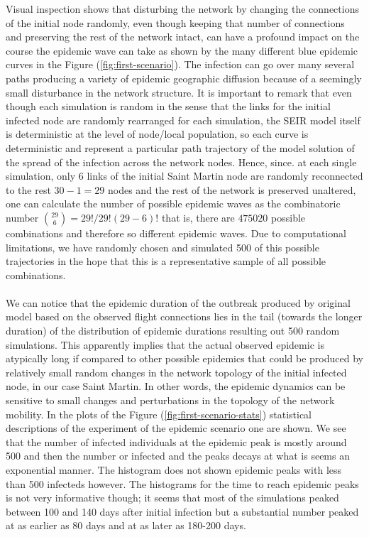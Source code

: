 \documentclass[10pt,a4paper]{article}
\begin{document}
Visual inspection shows that disturbing the network by changing the connections of the initial node randomly, even though keeping that number of connections and preserving the rest of the network intact, can have a profound impact on the course the epidemic wave can take as shown by the many different blue epidemic curves in the Figure (\ref{fig:first-scenario}). The infection can go over many several paths producing a variety of epidemic geographic diffusion because of a seemingly small disturbance in the network structure. It is important to remark that even though each simulation is random in the sense that the links for the initial infected node are randomly rearranged for each simulation, the SEIR model itself is deterministic at the level of node/local population, so each curve is deterministic and represent a particular path trajectory of the model solution of the spread of the infection across the network nodes. Hence, since. at each single simulation, only $6$ links of the initial Saint Martin node are randomly reconnected to the rest $30 - 1 = 29$ nodes and the rest of the network is preserved unaltered, one can calculate the number of possible epidemic waves as the combinatoric number $\binom{29}{6} = 29!/29!(29-6)!$ that is, there are $475020$ possible combinations and therefore so different epidemic waves. Due to computational limitations, we have randomly chosen and simulated 500 of this possible trajectories in the hope that this is a representative sample of all possible combinations. 
\\\\ 
We can notice that the epidemic duration of the outbreak produced by original model based on the observed flight connections lies in the tail (towards the longer duration) of the distribution of epidemic durations resulting out 500 random simulations. This apparently implies that the actual observed epidemic is atypically long if compared to other possible epidemics that could be produced by relatively small random changes in the network topology of the initial infected node, in our case Saint Martin. In other words, the epidemic dynamics can be sensitive to small changes and perturbations in the topology of the network mobility.     
%
In the plots of the Figure (\ref{fig:first-scenario-stats}) statistical descriptions of the experiment of the epidemic scenario one are shown. We see that the number of infected individuals at the epidemic peak is mostly around 500 and then the number or infected and the peaks decays at what is seems an exponential manner. The histogram does not shown epidemic peaks with less than 500 infecteds however. The histograms for the time to reach epidemic peaks is not very informative though; it seems that most of the simulations peaked between 100 and 140 days after initial infection but a substantial number peaked at as earlier as 80 days and at as later as 180-200 days. 
\end{document}
